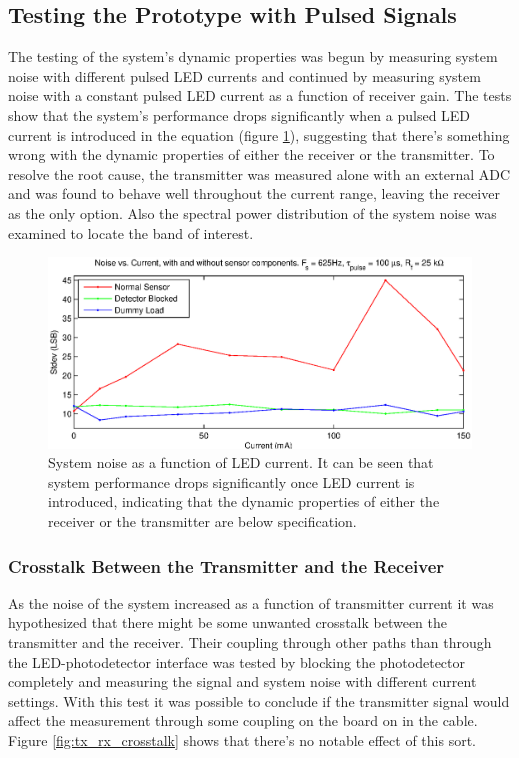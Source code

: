 \subsection{Testing the Prototype with Pulsed Signals}

The testing of the system's dynamic properties was begun by measuring system noise with different pulsed LED currents and continued by measuring system noise with a constant pulsed LED current as a function of receiver gain. The tests show that the system's performance drops significantly when a pulsed LED current is introduced in the equation (figure \ref{fig:noise_vs_current}), suggesting that there's something wrong with the dynamic properties of either the receiver or the transmitter. To resolve the root cause, the transmitter was measured alone with an external ADC and was found to behave well throughout the current range, leaving the receiver as the only option. Also the spectral power distribution of the system noise was examined to locate the band of interest.

\begin{figure}[htcb]
  \includegraphics[scale=0.8]{kuvat/measurements/noise_vs_current.eps}
  \caption{System noise as a function of LED current. It can be seen that system performance drops significantly once LED current is introduced, indicating that the dynamic properties of either the receiver or the transmitter are below specification.}
  \label{fig:noise_vs_current}
\end{figure}

\subsubsection{Crosstalk Between the Transmitter and the Receiver}

As the noise of the system increased as a function of transmitter current it was hypothesized that there might be some unwanted crosstalk between the transmitter and the receiver. Their coupling through other paths than through the LED-photodetector interface was tested by blocking the photodetector completely and measuring the signal and system noise with different current settings. With this test it was possible to conclude if the transmitter signal would affect the measurement through some coupling on the board on in the cable. Figure \ref{fig:tx_rx_crosstalk} shows that there's no notable effect of this sort.

